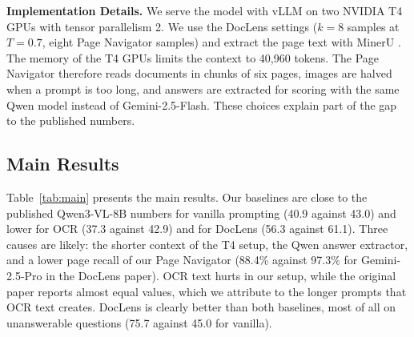 \documentclass[pdflatex,sn-basic]{sn-jnl}%
\theoremstyle{thmstyletwo}%
\begin{document}
\textbf{Implementation Details.} We serve the model with vLLM \cite{kwon2023vllm} on two NVIDIA T4 GPUs with tensor parallelism 2. We use the DocLens settings ($k=8$ samples at $T=0.7$, eight Page Navigator samples) and extract the page text with MinerU \cite{wang2024mineru}. The memory of the T4 GPUs limits the context to 40,960 tokens. The Page Navigator therefore reads documents in chunks of six pages, images are halved when a prompt is too long, and answers are extracted for scoring with the same Qwen model instead of Gemini-2.5-Flash. These choices explain part of the gap to the published numbers.

\subsection{Main Results}
\label{sec:main}
Table~\ref{tab:main} presents the main results. Our baselines are close to the published Qwen3-VL-8B numbers for vanilla prompting (40.9 against 43.0) and lower for OCR (37.3 against 42.9) and for DocLens (56.3 against 61.1). Three causes are likely: the shorter context of the T4 setup, the Qwen answer extractor, and a lower page recall of our Page Navigator (88.4\% against 97.3\% for Gemini-2.5-Pro in the DocLens paper). OCR text hurts in our setup, while the original paper reports almost equal values, which we attribute to the longer prompts that OCR text creates. DocLens is clearly better than both baselines, most of all on unanswerable questions (75.7 against 45.0 for vanilla).
\end{document}
